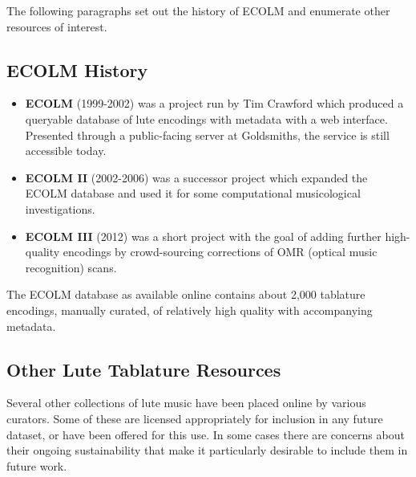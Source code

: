 \documentclass[twocolumn,10pt]{paper}
\begin{document}
\begin{sloppypar}
  The following paragraphs set out the history of ECOLM and enumerate
  other resources of interest.

  \subsection{ECOLM History}

  \begin{itemize}
  \item {\bf ECOLM} (1999-2002) was a project run by Tim Crawford
    which produced a queryable database of lute encodings with
    metadata with a web interface. Presented through a public-facing
    server at Goldsmiths, the service is still accessible today.
  \item {\bf ECOLM II} (2002-2006) was a successor project which
    expanded the ECOLM database and used it for some computational
    musicological investigations.
  \item {\bf ECOLM III} (2012) was a short project with the goal of
    adding further high-quality encodings by crowd-sourcing
    corrections of OMR (optical music recognition) scans.
  \end{itemize}

  The ECOLM database as available online contains about 2,000
  tablature encodings, manually curated, of relatively high quality
  with accompanying metadata.

  \subsection{Other Lute Tablature Resources}

  Several other collections of lute music have been placed online by
  various curators. Some of these are licensed appropriately for
  inclusion in any future dataset, or have been offered for this use.
  In some cases there are concerns about their ongoing sustainability
  that make it particularly desirable to include them in future work.


\end{sloppypar}
\end{document}
